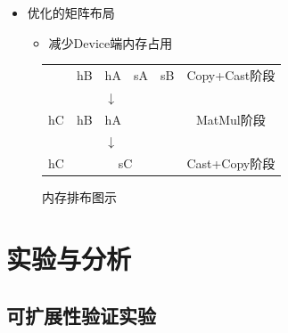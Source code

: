 \documentclass[
    fontset=fandol,
    xcolor=svgnames %
]{ctexbeamer}
\begin{document}
\begin{frame}
    \begin{itemize}
        \item 优化的矩阵布局
              \begin{itemize}
                  \item 减少Device端内存占用
              \end{itemize}
    \end{itemize}

    \begin{figure}[h]
        \centering
        \begin{tabular}{cccccc}
            \cline{1-5}
            \multicolumn{1}{|c|}{}           & \multicolumn{1}{c|}{hB} & \multicolumn{1}{c|}{hA} & \multicolumn{1}{c|}{sA} & \multicolumn{1}{c|}{sB} & Copy+Cast阶段 \\ \cline{1-5}
            \multicolumn{5}{c}{$\downarrow$} &                                                                                                                       \\ \cline{1-5}
            \multicolumn{1}{|c|}{hC}         & \multicolumn{1}{c|}{hB} & \multicolumn{1}{c|}{hA} & \multicolumn{2}{c|}{}   & MatMul阶段                              \\ \cline{1-5}
            \multicolumn{5}{c}{$\downarrow$} &                                                                                                                       \\ \cline{1-5}
            \multicolumn{1}{|c|}{hC}         & \multicolumn{4}{c|}{sC} & Cast+Copy阶段                                                                               \\ \cline{1-5}
        \end{tabular}
        \caption{内存排布图示}
        \label{内存排布图示}
    \end{figure}
\end{frame}

\section{实验与分析}
\subsection{可扩展性验证实验}
\end{document}
